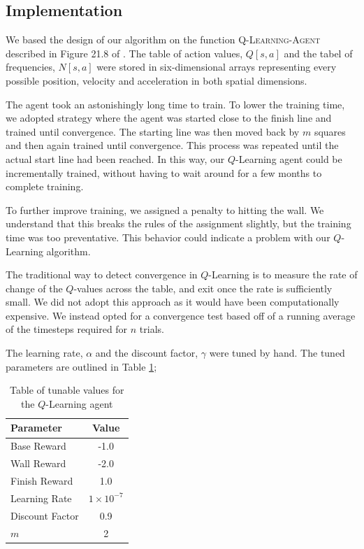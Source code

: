 \documentclass{article}
\begin{document}
		\subsection{Implementation}
			We based the design of our algorithm on the function \textsc{Q-Learning-Agent} described in Figure 21.8 of \cite{ai}. 
			The table of action values, $Q[s,a]$ and the tabel of frequencies, $N[s,a]$ were stored in six-dimensional arrays representing every possible position, velocity and acceleration in both spatial dimensions.
			
			The agent took an astonishingly long time to train. To lower the training time, we adopted strategy where the agent was started close to the finish line and trained until convergence. The starting line was then moved back by $m$ squares and then again trained until convergence. This process was repeated until the actual start line had been reached. In this way, our $Q$-Learning agent could be incrementally trained, without having to wait around for a few months to complete training.
			
			To further improve training, we assigned a penalty to hitting the wall. We understand that this breaks the rules of the assignment slightly, but the training time was too preventative. This behavior could indicate a problem with our $Q$-Learning algorithm.
			
			The traditional way to detect convergence in $Q$-Learning is to measure the rate of change of the $Q$-values across the table, and exit once the rate is sufficiently small. We did not adopt this approach as it would have been computationally expensive. We instead opted for a convergence test based off of a running average of the timesteps required for $n$ trials.
			
			The learning rate, $\alpha$ and the discount factor, $\gamma$ were tuned by hand. The tuned parameters are outlined in Table \ref{Q_params};
			
			\begin{table}
				\centering
				\begin{tabular}{|l|c|}
					\hline
					Parameter & Value \\ \hline
					Base Reward & -1.0 \\ 
					Wall Reward & -2.0 \\
					Finish Reward & 1.0 \\
					Learning Rate & $1 \times 10^{-7}$ \\
					Discount Factor & 0.9 \\
					$m$ & 2 \\ \hline
				\end{tabular}
				\caption{Table of tunable values for the $Q$-Learning agent}
				\label{Q_params}
			\end{table}
\end{document}
